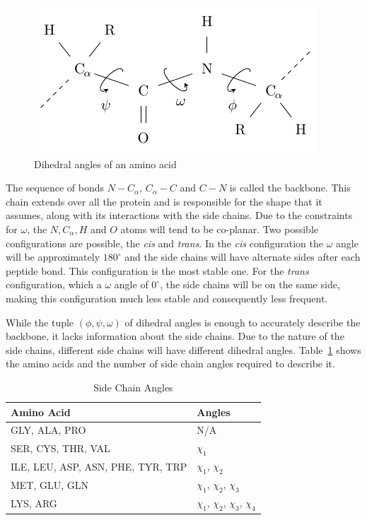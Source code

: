 \begin{figure}
    \centering
    \includegraphics[width=0.7\linewidth]{Figuras/angles.pdf}
    \caption{Dihedral angles of an amino acid}
    \label{fig:angles}
\end{figure}

The sequence of bonds $N - C_\alpha$, $C_\alpha - C$ and $C - N$ is called the backbone. This chain extends over all the protein and is responsible for the shape that it assumes, along with its interactions with the side chains. Due to the constraints for $\omega$, the $N, C_\alpha, H$ and $O$ atoms will tend to be co-planar. Two possible configurations are possible, the \textit{cis} and \textit{trans}. In the \textit{cis} configuration the $\omega$ angle will be approximately $180^\circ$ and the side chains will have alternate sides after each peptide bond. This configuration is the most stable one. For the \textit{trans} configuration, which a $\omega$ angle of $0^\circ$, the side chains will be on the same side, making this configuration much less stable and consequently less frequent.

While the tuple $(\phi, \psi, \omega)$ of dihedral angles is enough to accurately
describe the backbone, it lacks information about the side chains. Due to the nature of the side chains, different side chains will have different dihedral angles. Table~\ref{tab:side-chain-angles} shows the amino acids and the number of side chain angles required to describe it.

\begin{table}[]
    \centering
    \begin{tabular}{l|l} \hline \hline
        Amino Acid & Angles \\ \hline \hline
        GLY, ALA, PRO & N/A \\
        SER, CYS, THR, VAL & $\chi_1$ \\
        ILE, LEU, ASP, ASN, PHE, TYR, TRP & $\chi_1$, $\chi_2$ \\
        MET, GLU, GLN & $\chi_1$, $\chi_2$, $\chi_3$ \\
        LYS, ARG & $\chi_1$, $\chi_2$, $\chi_3$, $\chi_4$ \\
        \hline \hline
    \end{tabular}
    \caption{Side Chain Angles}
    \label{tab:side-chain-angles}
\end{table}

